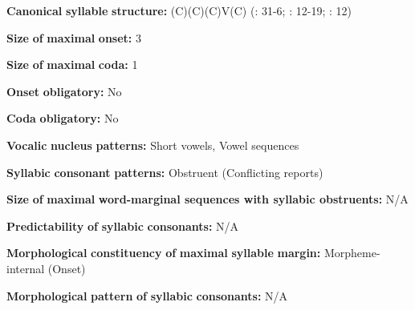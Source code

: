 \documentclass[output=paper]{langsci/langscibook}
\begin{document}
\begin{styleBody}
\textbf{Canonical} \textbf{syllable} \textbf{structure:} (C)(C)(C)V(C) (\citealt{Anceaux1965}: 31-6; \citealt{May1997}: 12-19; \citealt{MayMay1981}: 12)
\end{styleBody}

\begin{styleBody}
\textbf{Size} \textbf{of} \textbf{maximal} \textbf{onset:} 3
\end{styleBody}

\begin{styleBody}
\textbf{Size} \textbf{of} \textbf{maximal} \textbf{coda:} 1
\end{styleBody}

\begin{styleBody}
\textbf{Onset} \textbf{obligatory:} No
\end{styleBody}

\begin{styleBody}
\textbf{Coda} \textbf{obligatory:} No
\end{styleBody}

\begin{styleBody}
\textbf{Vocalic} \textbf{nucleus} \textbf{patterns:} Short vowels, Vowel sequences
\end{styleBody}

\begin{styleBody}
\textbf{Syllabic} \textbf{consonant} \textbf{patterns:} Obstruent (Conflicting reports)
\end{styleBody}

\begin{styleBody}
\textbf{Size} \textbf{of} \textbf{maximal} \textbf{word{}-marginal sequences with syllabic obstruents:} N/A
\end{styleBody}

\begin{styleBody}
\textbf{Predictability} \textbf{of} \textbf{syllabic} \textbf{consonants:} N/A
\end{styleBody}

\begin{styleBody}
\textbf{Morphological} \textbf{constituency} \textbf{of} \textbf{maximal} \textbf{syllable} \textbf{margin:} Morpheme-internal (Onset)
\end{styleBody}

\begin{styleBody}
\textbf{Morphological} \textbf{pattern} \textbf{of} \textbf{syllabic} \textbf{consonants:} N/A
\end{styleBody}
\end{document}
